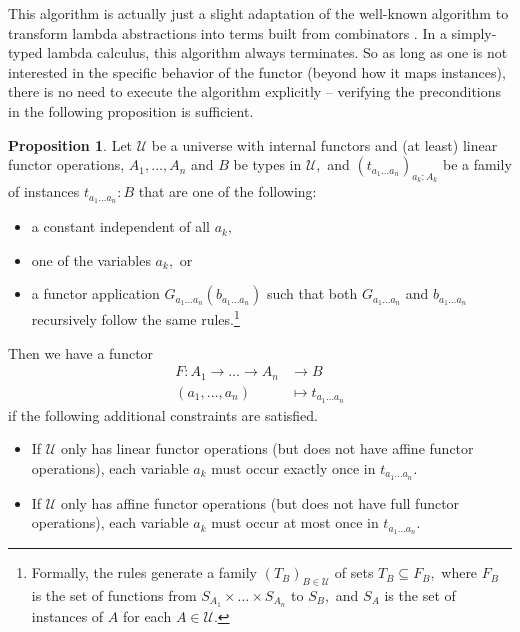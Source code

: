 \documentclass[a4paper]{article}
\theoremstyle{definition}
\newtheorem{proposition}[definition]{Proposition}
\theoremstyle{remark}
\newcommand{\U}{\mathcal{U}}
\begin{document}
This algorithm is actually just a slight adaptation of the well-known algorithm to
transform lambda abstractions into terms built from combinators \cite{combinators}. In a
simply-typed lambda calculus, this algorithm always terminates. So as long as one is
not interested in the specific behavior of the functor (beyond how it maps instances),
there is no need to execute the algorithm explicitly -- verifying the preconditions
in the following proposition is sufficient.

\begin{proposition}
  \label{prp:functoriality}
  Let $\U$ be a universe with internal functors and (at least) linear functor
  operations, $A_1,\ldots,A_n$ and $B$ be types in $\U,$ and
  $(t_{a_1 \ldots a_n})_{a_k : A_k}$ be a family of instances $t_{a_1 \ldots a_n} : B$
  that are one of the following:
  \begin{itemize}
    \item a constant independent of all $a_k,$
    \item one of the variables $a_k,$ or
    \item a functor application $G_{a_1 \ldots a_n}(b_{a_1 \ldots a_n})$ such that
    both $G_{a_1 \ldots a_n}$ and $b_{a_1 \ldots a_n}$ recursively follow the same
    rules.\footnote{Formally, the rules generate a family $(T_B)_{B \in \U}$ of
    sets $T_B \subseteq F_B,$ where $F_B$ is the set of functions from
    $S_{A_1} \times \dots \times S_{A_n}$ to $S_B,$ and $S_A$ is the set of
    instances of $A$ for each $A \in \U.$}
  \end{itemize}
  Then we have a functor
  \begin{align*}
    F : A_1 \to \dots \to A_n &\to     B\\
        (a_1,\ldots,a_n)      &\mapsto t_{a_1 \ldots a_n}
  \end{align*}
  if the following additional constraints are satisfied.
  \begin{itemize}
    \item If $\U$ only has linear functor operations (but does not have affine
    functor operations), each variable $a_k$ must occur exactly once in $t_{a_1 \ldots a_n}.$
    \item If $\U$ only has affine functor operations (but does not have full
    functor operations), each variable $a_k$ must occur at most once in $t_{a_1 \ldots a_n}.$
  \end{itemize}
\end{proposition}
\end{document}

